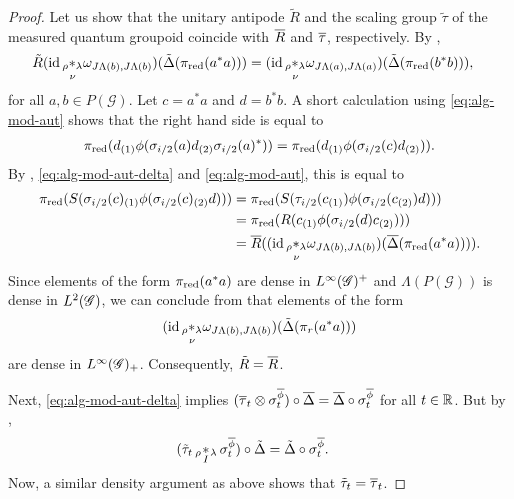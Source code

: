 \begin{proof}
Let us show   that the unitary antipode  $\tilde R$ and the
  scaling group   $\tilde\tau$ of the measured quantum groupoid
  coincide with $\overline{R}$ and $\overline{\tau}$, respectively.
  By \cite[Theorem A.6]{Eno2},
  \begin{align*}
    \tilde R(\operatorname{id} \underset{\nu}{_{\rho} \ast_{\lambda}}
    \omega_{J\Lambda(b),J\Lambda(b)})(\tilde\Delta(\pi_{\operatorname{\mathrm{red}}}(a^{*}a))) &= (\operatorname{id}
    \underset{\nu}{_{\rho} \ast_{\lambda}}
    \omega_{J\Lambda(a),J\Lambda(a)})(\tilde\Delta(\pi_{\operatorname{\mathrm{red}}}(b^{*}b))),
  \end{align*}
  for all $a,b\in P(\mathscr{G})$.  Let $c=a^{*}a$ and $d=b^{*}b$.  A
  short calculation using \eqref{eq:alg-mod-aut} shows that the right hand
  side is equal to
\begin{align*}
  \pi_{\operatorname{\mathrm{red}}} ( d_{(1)}\phi(\sigma_{i/2}(a)d_{(2)}\sigma_{i/2}(a)^{*})) =
  \pi_{\operatorname{\mathrm{red}}}(d_{(1)}\phi(\sigma_{i/2}(c)d_{(2)})).
  \end{align*}
By \cite[Lemma 1.13]{DCT1},  \eqref{eq:alg-mod-aut-delta} and
  \eqref{eq:alg-mod-aut},  this is equal to
  \begin{align*}
   \pi_{\operatorname{\mathrm{red}}}(S(\sigma_{i/2}(c)_{(1)}\phi(\sigma_{i/2}(c)_{(2)}d))) &=
   \pi_{\operatorname{\mathrm{red}}}(S(\tau_{i/2}(c_{(1)})\phi(\sigma_{i/2}(c_{(2)})d))) \\
   &= \pi_{\operatorname{\mathrm{red}}}(R(c_{(1)}\phi(\sigma_{i/2}(d)c_{(2)}))) \\
   &=\overline{R}((\operatorname{id} \underset{\nu}{_{\rho} \ast_{\lambda}}
    \omega_{J\Lambda(b),J\Lambda(b)})(\overline{\Delta}(\pi_{\operatorname{\mathrm{red}}}(a^{*}a)))).
  \end{align*}
  Since elements of the form $\pi_{\operatorname{\mathrm{red}}}(a^{*}a)$ are dense in
  $L^{\infty}(\mathscr{G})^{+}$ and $\Lambda(P(\mathscr{G}))$ is dense in $L^{2}(\mathscr{G})$, we
  can conclude from \cite[Theorem A.7]{Eno2} that elements of the form
  \begin{align*}
  (\operatorname{id} \underset{\nu}{_{\rho}
    \ast_{\lambda}}
  \omega_{J\Lambda(b),J\Lambda(b)})(\tilde\Delta(\pi_{r}(a^{*}a)))  
  \end{align*}
 are
  dense in $L^{\infty}(\mathscr{G})_{+}$. Consequently, $\tilde R=\overline{R}$. 

Next,  \eqref{eq:alg-mod-aut-delta} implies $(\overline{\tau}_{t} \otimes
  \sigma^{\overline{\phi}}_{t}) \circ \overline{\Delta} = \overline{\Delta} \circ
  \sigma^{\overline{\phi}}_{t}$ for all $t\in \mathbb{R}$.  But by \cite[Theorem
  A.5]{Eno2},
  \begin{align*}
    (\tilde \tau_{t} \,{}_{\rho}\!\underset{I}{\ast}\,\!\!_{\lambda}\, \sigma^{\overline{\phi}}_{t}) \circ \tilde \Delta
    &=\tilde \Delta \circ \sigma^{\overline{\phi}}_{t}.
  \end{align*}
Now,  a similar density  argument as above shows that
  $\tilde \tau_{t}=\overline{\tau}_{t}$.
\end{proof}

